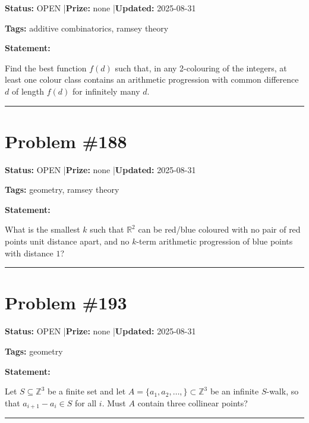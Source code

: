 \documentclass{article}
\begin{document}
\noindent\textbf{Status:} OPEN \quad|\quad \textbf{Prize:} none \quad|\quad \textbf{Updated:} 2025-08-31

\noindent\textbf{Tags:} additive combinatorics, ramsey theory

\medskip

\noindent\textbf{Statement:}

Find the best function $f(d)$ such that, in any 2-colouring of the integers, at least one colour class contains an arithmetic progression with common difference $d$ of length $f(d)$ for infinitely many $d$.

\noindent\rule{\linewidth}{0.4pt}


\section{Problem \#188}
\label{prob:188}

\noindent\textbf{Status:} OPEN \quad|\quad \textbf{Prize:} none \quad|\quad \textbf{Updated:} 2025-08-31

\noindent\textbf{Tags:} geometry, ramsey theory

\medskip

\noindent\textbf{Statement:}

What is the smallest $k$ such that $\mathbb{R}^2$ can be red/blue coloured with no pair of red points unit distance apart, and no $k$-term arithmetic progression of blue points with distance $1$?

\noindent\rule{\linewidth}{0.4pt}


\section{Problem \#193}
\label{prob:193}

\noindent\textbf{Status:} OPEN \quad|\quad \textbf{Prize:} none \quad|\quad \textbf{Updated:} 2025-08-31

\noindent\textbf{Tags:} geometry

\medskip

\noindent\textbf{Statement:}

Let $S\subseteq \mathbb{Z}^3$ be a finite set and let $A=\{a_1,a_2,\ldots,\}\subset \mathbb{Z}^3$ be an infinite $S$-walk, so that $a_{i+1}-a_i\in S$ for all $i$. Must $A$ contain three collinear points?

\noindent\rule{\linewidth}{0.4pt}
\end{document}
